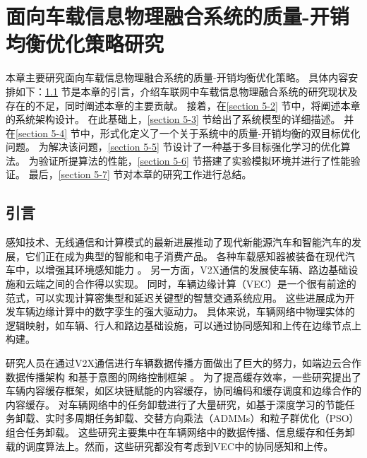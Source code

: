 \chapter{面向车载信息物理融合系统的质量-开销均衡优化策略研究}

本章主要研究面向车载信息物理融合系统的质量-开销均衡优化策略。
具体内容安排如下：\ref{section 5-1} 节是本章的引言，介绍车联网中车载信息物理融合系统的研究现状及存在的不足，同时阐述本章的主要贡献。
接着，在\ref{section 5-2} 节中，将阐述本章的系统架构设计。
在此基础上，\ref{section 5-3} 节给出了系统模型的详细描述。
并在\ref{section 5-4} 节中，形式化定义了一个关于系统中的质量-开销均衡的双目标优化问题。
为解决该问题，\ref{section 5-5} 节设计了一种基于多目标强化学习的优化算法。
为验证所提算法的性能，\ref{section 5-6} 节搭建了实验模拟环境并进行了性能验证。
最后，\ref{section 5-7} 节对本章的研究工作进行总结。

\section{引言}\label{section 5-1}

感知技术、无线通信和计算模式的最新进展推动了现代新能源汽车和智能汽车的发展，它们正在成为典型的智能和电子消费产品。
各种车载感知器被装备在现代汽车中，以增强其环境感知能力 \cite{zhu2017overview}。
另一方面，V2X通信\cite{chen2020a}的发展使车辆、路边基础设施和云端之间的合作得以实现。
同时，车辆边缘计算（VEC）\cite{dai2021edge}是一个很有前途的范式，可以实现计算密集型和延迟关键型的智慧交通系统\cite{zhao2022foundation}应用。
这些进展成为开发车辆边缘计算中的数字孪生的强大驱动力。
具体来说，车辆网络中物理实体的逻辑映射，如车辆、行人和路边基础设施，可以通过协同感知和上传在边缘节点上构建。

研究人员在通过V2X通信进行车辆数据传播方面做出了巨大的努力，如端边云合作数据传播架构 \cite{liu2021fog}和基于意图的网络控制框架 \cite{singh2020intent}。
为了提高缓存效率，一些研究提出了车辆内容缓存框架，如区块链赋能的内容缓存\cite{dai2020deep}，协同编码和缓存调度\cite{xiao2021cooperative}和边缘合作的内容缓存\cite{su2018an}。
对车辆网络中的任务卸载进行了大量研究，如基于深度学习的节能任务卸载\cite{shang2021deep}、实时多周期任务卸载\cite{liu2021rtds}、交替方向乘法（ADMMs）和粒子群优化（PSO）组合任务卸载\cite{liu2022a}。
这些研究主要集中在车辆网络中的数据传播、信息缓存和任务卸载的调度算法上。然而，这些研究都没有考虑到VEC中的协同感知和上传。 

